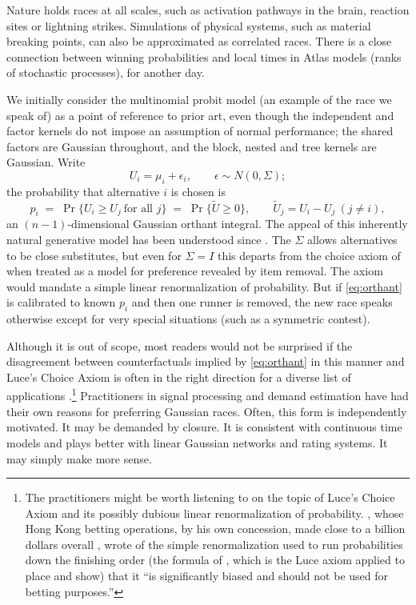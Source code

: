 \documentclass[11pt]{article}
\begin{document}
Nature holds races at all scales, such as activation pathways in the brain, reaction sites or lightning strikes. Simulations of physical systems, such as material breaking points, can also be approximated as correlated races. There is a close connection between winning probabilities and local times in Atlas models (ranks of stochastic processes), for another day.

We initially consider the multinomial probit model (an example of the race we speak of) as a point of reference to prior art, even though the independent and factor kernels do not impose an assumption of normal performance; the shared factors are Gaussian throughout, and the block, nested and tree kernels are Gaussian. Write
\begin{equation}
U_i = \mu_i + \epsilon_i, \qquad \epsilon\sim N(0,\Sigma);
\end{equation}
the probability that alternative $i$ is chosen is
\begin{equation}\label{eq:orthant}
p_i \;=\; \Pr\{U_i \ge U_j \ \text{for all } j\}
      \;=\; \Pr\{\tilde U \ge 0\},
\qquad \tilde U_j = U_i - U_j \ (j\ne i),
\end{equation}
an $(n-1)$-dimensional Gaussian orthant integral. The appeal of this inherently natural generative model has been understood since \citet{thurstone1927}. The $\Sigma$ allows alternatives to be close substitutes, but even for $\Sigma=I$ this departs from the choice axiom of \citet{luce1959} when treated as a model for preference revealed by item removal. The axiom would mandate a simple linear renormalization of probability. But if \eqref{eq:orthant} is calibrated to known $p_i$ and then one runner is removed, the new race speaks otherwise except for very special situations (such as a symmetric contest).

Although it is out of scope, most readers would not be surprised if the disagreement between counterfactuals implied by \eqref{eq:orthant} in this manner and Luce's Choice Axiom is often in the right direction for a diverse list of applications \citep{cottonsurvey}.\footnote{The practitioners might be worth listening to on the topic of Luce's Choice Axiom and its possibly dubious linear renormalization of probability. \citet{benter1994},
whose Hong Kong betting operations, by his own concession, made close to a
billion dollars overall \citep{chellel2018}, wrote of the simple
renormalization used to run probabilities down the finishing order (the
formula of \citet{harville1973}, which is the Luce axiom applied to place
and show)
that it ``is significantly biased and should not be used for betting
purposes.''} Practitioners in signal processing and demand estimation have had their own reasons for preferring Gaussian races. Often, this form is independently motivated. It may be demanded by closure. It is consistent with continuous time models and plays better with linear Gaussian networks and rating systems. It may simply make more sense.
\end{document}
